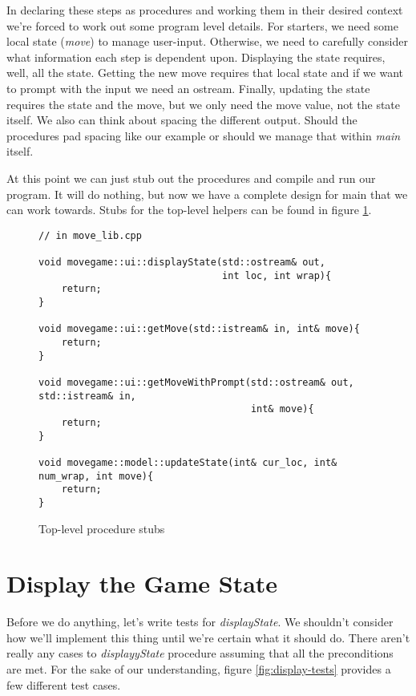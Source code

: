 \documentclass[nobib]{tufte-handout}
\begin{document}
In declaring these steps as procedures and working them in their desired context we're forced to work out some program level details. For starters, we need some local state (\textit{move}) to manage user-input. Otherwise, we need to carefully consider what information each step is dependent upon. Displaying the state requires, well, all the state. Getting the new move requires that local state and if we want to prompt with the input we need an ostream. Finally, updating the state requires the state and the move, but we only need the move value, not the state itself. We also can think about spacing the different output. Should the procedures pad spacing like our example or should we manage that within \textit{main} itself.

At this point we can just stub out the procedures and compile and run our program. It will do nothing, but now we have a complete design for main that we can work towards. Stubs for the top-level helpers can be found in figure \ref{fig:top-stubs}.

\begin{figure}[!htbp]
\begin{lstlisting}
// in move_lib.cpp

void movegame::ui::displayState(std::ostream& out,
	                            int loc, int wrap){
	return;	                            
}	       

void movegame::ui::getMove(std::istream& in, int& move){
	return;
}
 
void movegame::ui::getMoveWithPrompt(std::ostream& out, std::istream& in,
								     int& move){
	return;
}
                     
void movegame::model::updateState(int& cur_loc, int& num_wrap, int move){
	return;
}
\end{lstlisting}
\caption{Top-level procedure stubs}
\label{fig:top-stubs}
\end{figure}

\section{Display the Game State}

Before we do anything, let's write tests for \textit{displayState}. We shouldn't consider how we'll implement this thing until we're certain what it should do. There aren't really any cases to \textit{displayyState} procedure assuming that all the preconditions are met.  For the sake of our understanding, figure \ref{fig:display-tests} provides a few different test cases. 
\end{document}
